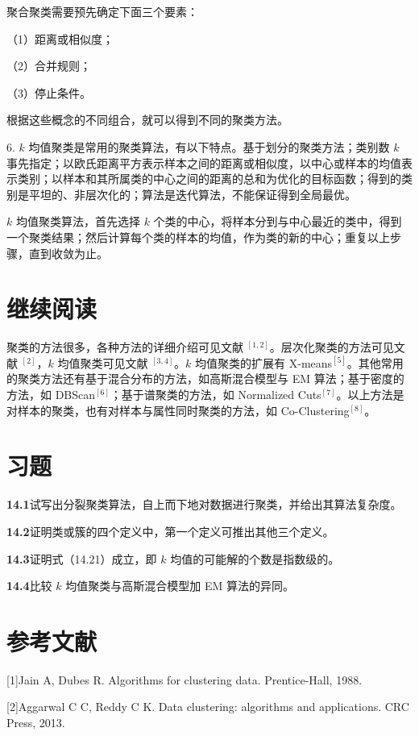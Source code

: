 \documentclass[UTF8, 12pt, fontset=fandol, oneside]{ctexart}
\begin{document}
聚合聚类需要预先确定下面三个要素：

（1）距离或相似度；

（2）合并规则；

（3）停止条件。

根据这些概念的不同组合，就可以得到不同的聚类方法。

6. $k$ 均值聚类是常用的聚类算法，有以下特点。基于划分的聚类方法；类别数 $k$ 事先指定；以欧氏距离平方表示样本之间的距离或相似度，以中心或样本的均值表示类别；以样本和其所属类的中心之间的距离的总和为优化的目标函数；得到的类别是平坦的、非层次化的；算法是迭代算法，不能保证得到全局最优。

$k$ 均值聚类算法，首先选择 $k$ 个类的中心，将样本分到与中心最近的类中，得到一个聚类结果；然后计算每个类的样本的均值，作为类的新的中心；重复以上步骤，直到收敛为止。

\section*{继续阅读}

聚类的方法很多，各种方法的详细介绍可见文献 $^{[1,2]}$。层次化聚类的方法可见文献 $^{[2]}$，$k$ 均值聚类可见文献 $^{[3,4]}$。$k$ 均值聚类的扩展有 X-means$^{[5]}$。其他常用的聚类方法还有基于混合分布的方法，如高斯混合模型与 EM 算法；基于密度的方法，如 DBScan$^{[6]}$；基于谱聚类的方法，如 Normalized Cuts$^{[7]}$。以上方法是对样本的聚类，也有对样本与属性同时聚类的方法，如 Co-Clustering$^{[8]}$。

\section*{习题}

\noindent\textbf{14.1}\quad 试写出分裂聚类算法，自上而下地对数据进行聚类，并给出其算法复杂度。

\noindent\textbf{14.2}\quad 证明类或簇的四个定义中，第一个定义可推出其他三个定义。

\noindent\textbf{14.3}\quad 证明式（14.21）成立，即 $k$ 均值的可能解的个数是指数级的。

\noindent\textbf{14.4}\quad 比较 $k$ 均值聚类与高斯混合模型加 EM 算法的异同。

\section*{参考文献}

[1]\quad Jain A, Dubes R. Algorithms for clustering data. Prentice-Hall, 1988.

[2]\quad Aggarwal C C, Reddy C K. Data clustering: algorithms and applications. CRC Press, 2013.
\end{document}
